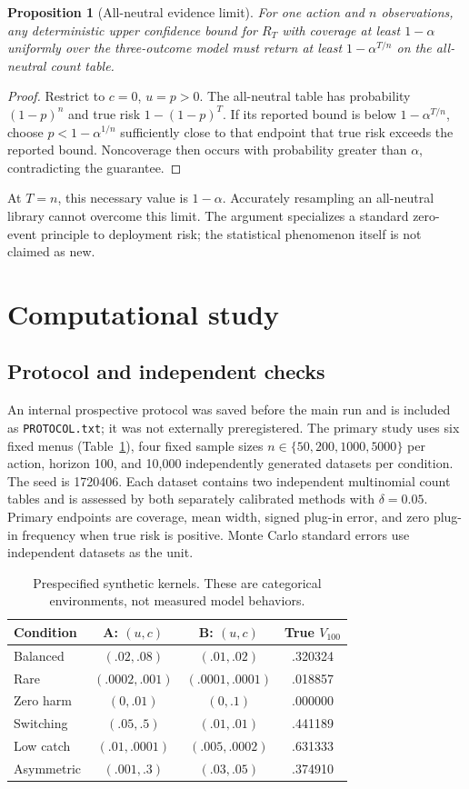 \documentclass[10pt]{article}
\newtheorem{proposition}[theorem]{Proposition}
\begin{document}
\begin{proposition}[All-neutral evidence limit]\label{thm:neutral}
For one action and $n$ observations, any deterministic upper confidence bound for $R_T$ with coverage at least $1-\alpha$ uniformly over the three-outcome model must return at least $1-\alpha^{T/n}$ on the all-neutral count table.
\end{proposition}
\begin{proof}
Restrict to $c=0$, $u=p>0$. The all-neutral table has probability $(1-p)^n$ and true risk $1-(1-p)^T$. If its reported bound is below $1-\alpha^{T/n}$, choose $p<1-\alpha^{1/n}$ sufficiently close to that endpoint that true risk exceeds the reported bound. Noncoverage then occurs with probability greater than $\alpha$, contradicting the guarantee.
\end{proof}
At $T=n$, this necessary value is $1-\alpha$. Accurately resampling an all-neutral library cannot overcome this limit. The argument specializes a standard zero-event principle to deployment risk; the statistical phenomenon itself is not claimed as new.

\section{Computational study}\label{sec:study}
\subsection{Protocol and independent checks}
An internal prospective protocol was saved before the main run and is included as \texttt{PROTOCOL.txt}; it was not externally preregistered. The primary study uses six fixed menus (Table~\ref{tab:menus}), four fixed sample sizes $n\in\{50,200,1000,5000\}$ per action, horizon 100, and 10,000 independently generated datasets per condition. The seed is 1720406. Each dataset contains two independent multinomial count tables and is assessed by both separately calibrated methods with $\delta=0.05$. Primary endpoints are coverage, mean width, signed plug-in error, and zero plug-in frequency when true risk is positive. Monte Carlo standard errors use independent datasets as the unit.

\begin{table}[ht]\centering\small
\begin{tabular}{lccc}\toprule
Condition & A: $(u,c)$ & B: $(u,c)$ & True $V_{100}$\\\midrule
Balanced & $(.02,.08)$ & $(.01,.02)$ & .320324\\
Rare & $(.0002,.001)$ & $(.0001,.0001)$ & .018857\\
Zero harm & $(0,.01)$ & $(0,.1)$ & .000000\\
Switching & $(.05,.5)$ & $(.01,.01)$ & .441189\\
Low catch & $(.01,.0001)$ & $(.005,.0002)$ & .631333\\
Asymmetric & $(.001,.3)$ & $(.03,.05)$ & .374910\\\bottomrule
\end{tabular}
\caption{Prespecified synthetic kernels. These are categorical environments, not measured model behaviors.}\label{tab:menus}\end{table}
\end{document}
